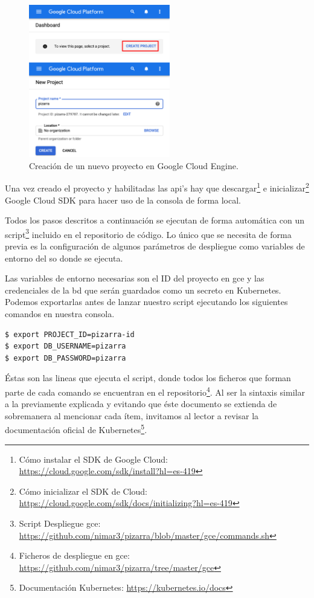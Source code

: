 \documentclass[11pt,spanish,listoffigures,listoftables]{tfgetsinf}
\begin{document}
\begin{figure}[ht]
	\centering
	\includegraphics[width=0.55\textwidth]{img/gce-new-project}
	\caption[nuevo proyecto en GCE]{Creación de un nuevo proyecto en Google Cloud Engine.}
	\label{figura:gce-new-project}
\end{figure}

Una vez creado el proyecto y habilitadas las \acrshort{api}'s hay que descargar\footnote{Cómo instalar el SDK de Google Cloud: \url{https://cloud.google.com/sdk/install?hl=es-419}} e inicializar\footnote{Cómo inicializar el SDK de Cloud:  \url{https://cloud.google.com/sdk/docs/initializing?hl=es-419}} Google Cloud SDK para hacer uso de la consola de forma local. 

Todos los pasos descritos a continuación se ejecutan de forma automática con un script\footnote{Script Despliegue \acrshort{gce}: \url{https://github.com/nimar3/pizarra/blob/master/gce/commands.sh}} incluido en el repositorio de código. Lo único que se necesita de forma previa es la configuración de algunos parámetros de despliegue como variables de entorno del \acrshort{so} donde se ejecuta.

Las variables de entorno necesarias son el ID del proyecto en \acrshort{gce} y las credenciales de la \acrshort{bd} que serán guardados como un secreto en Kubernetes. Podemos exportarlas antes de lanzar nuestro script ejecutando los siguientes comandos en nuestra consola.

\begin{lstlisting}[language=bash]
$ export PROJECT_ID=pizarra-id
$ export DB_USERNAME=pizarra
$ export DB_PASSWORD=pizarra
\end{lstlisting}

Éstas son las lineas que ejecuta el script, donde todos los ficheros que forman parte de cada comando se encuentran en el repositorio\footnote{Ficheros de despliegue en \acrshort{gce}: \url{https://github.com/nimar3/pizarra/tree/master/gce}}. Al ser la sintaxis similar a la previamente explicada y evitando que éste documento se extienda de sobremanera al mencionar cada ítem, invitamos al lector a revisar la documentación oficial de Kubernetes\footnote{Documentación Kubernetes: \url{https://kubernetes.io/docs}}.
\end{document}
